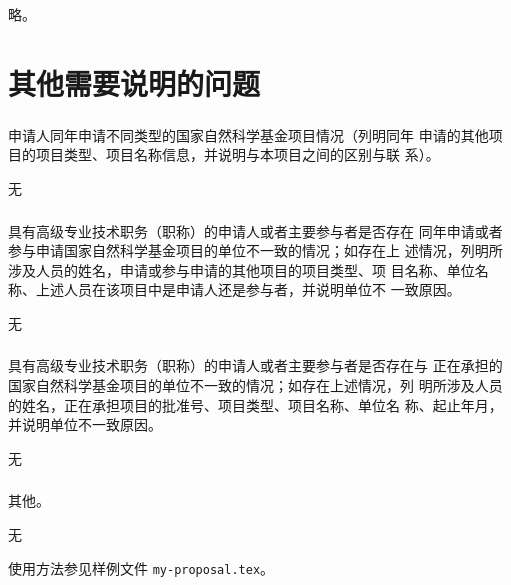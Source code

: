 略。

\part{其他需要说明的问题}
\label{cha:others}

\section{}{申请人同年申请不同类型的国家自然科学基金项目情况（列明同年
  申请的其他项目的项目类型、项目名称信息，并说明与本项目之间的区别与联
  系）。}

无

\section{}{具有高级专业技术职务（职称）的申请人或者主要参与者是否存在
  同年申请或者参与申请国家自然科学基金项目的单位不一致的情况；如存在上
  述情况，列明所涉及人员的姓名，申请或参与申请的其他项目的项目类型、项
  目名称、单位名称、上述人员在该项目中是申请人还是参与者，并说明单位不
  一致原因。}

无

\section{}{具有高级专业技术职务（职称）的申请人或者主要参与者是否存在与
  正在承担的国家自然科学基金项目的单位不一致的情况；如存在上述情况，列
  明所涉及人员的姓名，正在承担项目的批准号、项目类型、项目名称、单位名
  称、起止年月， 并说明单位不一致原因。}

无

\section{}{其他。}

无

使用方法参见样例文件 \texttt{my-proposal.tex}。

